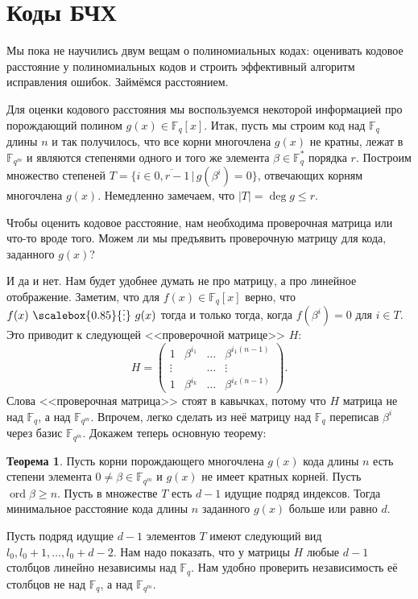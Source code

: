 \documentclass[12pt,a4paper,oneside]{book}
\theoremstyle{definition}
\newtheorem{thm}{\color{red!40!black}Теорема}
\renewcommand{\leq}{\leqslant}
\renewcommand{\geq}{\geqslant}
\newcommand{\ovl}{\overline}
\newcommand{\ord}{\operatorname{ord}}
\newcommand{\di}{\mathop{\,\scalebox{0.85}{\raisebox{-1.2pt}[0.5\height]{\vdots}}\,}}
\newcommand{\F}{\mathbb F}
\def\thrm{\begin{thm}}
\def\ethrm{\end{thm}}
\def\pmat{\begin{pmatrix}}
\def\epmat{\end{pmatrix}}
\begin{document}
\section{Коды БЧХ}

Мы пока не научились двум вещам о полиномиальных кодах: оценивать кодовое расстояние у полиномиальных кодов и строить эффективный алгоритм исправления ошибок. Займёмся расстоянием.

Для оценки кодового расстояния мы воспользуемся некоторой информацией про порождающий полином $g(x)\in \F_q[x]$. Итак, пусть мы строим код над $\F_q$ длины $n$ и так получилось, что все корни многочлена $g(x)$ не кратны, лежат в $\F_{q^m}$ и являются степенями одного и того же элемента $\beta\in \F_q^*$ порядка $r$. Построим  множество степеней $T=\{i\in\ovl{0,r-1} \,|\, g(\beta^i)=0\}$, отвечающих корням многочлена $g(x)$. Немедленно замечаем, что $|T|=\deg g \leq r$.  

Чтобы оценить кодовое расстояние, нам необходима проверочная матрица или что-то вроде того. Можем ли мы предъявить проверочную матрицу для кода, заданного $g(x)$?

И да и нет. Нам будет удобнее думать не про матрицу, а про линейное отображение. Заметим, что для $f(x)\in \F_q[x]$ верно, что $f(x) \di g(x)$ тогда и только тогда, когда $f(\beta^i)=0$ для $i\in T$. Это приводит к следующей <<проверочной матрице>> $H$:
$$H=\pmat 1& \beta^{i_1}& \dots& \beta^{i_1(n-1)}\\
\vdots &&\dots&\vdots\\
1& \beta^{i_k}& \dots & \beta^{i_k(n-1)}
\epmat.$$
Слова <<проверочная матрица>> стоят в кавычках, потому что $H$ матрица не над $\F_q$, а над $\F_{q^m}$. Впрочем, легко сделать из неё матрицу над $\F_q$ переписав $\beta^i$ через базис $\F_{q^m}$. Докажем теперь основную теорему:

\thrm Пусть корни порождающего многочлена $g(x)$ кода длины $n$ есть степени элемента $0\neq \beta \in \F_{q^m}$ и $g(x)$ не имеет кратных корней. Пусть $\ord \beta \geq n$. Пусть в множестве $T$ есть $d-1$ идущие подряд индексов. Тогда минимальное расстояние кода длины $n$ заданного $g(x)$ больше или равно $d$.
\ethrm
\proof
Пусть подряд идущие $d-1$ элементов $T$ имеют следующий вид $l_0, l_0+1,\dots,l_0+d-2$. Нам надо показать, что у матрицы $H$ любые $d-1$ столбцов линейно независимы над $\F_q$. Нам удобно проверить независимость её столбцов не над $\F_q$, а над $\F_{q^m}$.
\end{document}
